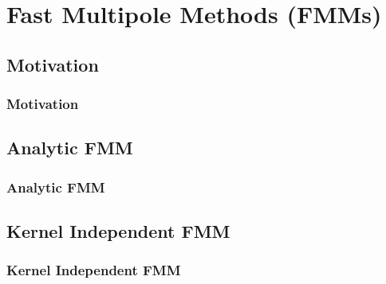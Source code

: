 \section{Fast Multipole Methods (FMMs)}

\subsection{Motivation}
\begin{frame}
    \frametitle{Motivation}
\end{frame}

\subsection{Analytic FMM}
\begin{frame}
    \frametitle{Analytic FMM}
\end{frame}

\subsection{Kernel Independent FMM}
\begin{frame}
    \frametitle{Kernel Independent FMM}
\end{frame}

